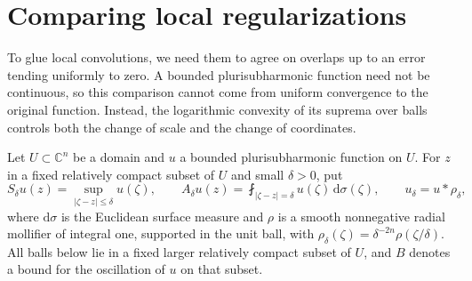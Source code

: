 \section{Comparing local regularizations}

To glue local convolutions, we need them to agree on overlaps up to an error tending uniformly to zero. A bounded plurisubharmonic function need not be continuous, so this comparison cannot come from uniform convergence to the original function. Instead, the logarithmic convexity of its suprema over balls controls both the change of scale and the change of coordinates.

Let $U\subset\mathbb C^n$ be a domain and $u$ a bounded plurisubharmonic function on $U$. For $z$ in a fixed relatively compact subset of $U$ and small $\delta>0$, put
\[
 S_\delta u(z)=\sup_{|\zeta-z|\leq\delta}u(\zeta),\qquad
 A_\delta u(z)=\fint_{|\zeta-z|=\delta}u(\zeta)\,\mathrm{d}\sigma(\zeta),
 \qquad u_\delta=u*\rho_\delta,
\]
where $\mathrm{d}\sigma$ is the Euclidean surface measure and $\rho$ is a smooth nonnegative radial mollifier of integral one, supported in the unit ball, with $\rho_\delta(\zeta)=\delta^{-2n}\rho(\zeta/\delta)$. All balls below lie in a fixed larger relatively compact subset of $U$, and $B$ denotes a bound for the oscillation of $u$ on that subset.

